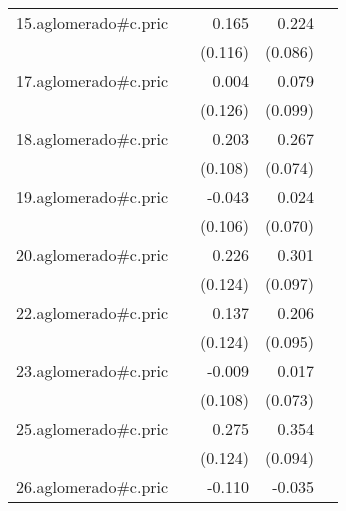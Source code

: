 {\begin{longtable}{l*{4}{D{.}{.}{-1}}}
\addlinespace
15.aglomerado#c.pric&                     &       0.165         &       0.224\sym{**} &                     \\
            &                     &     (0.116)         &     (0.086)         &                     \\
\addlinespace
17.aglomerado#c.pric&                     &       0.004         &       0.079         &                     \\
            &                     &     (0.126)         &     (0.099)         &                     \\
\addlinespace
18.aglomerado#c.pric&                     &       0.203         &       0.267\sym{***}&                     \\
            &                     &     (0.108)         &     (0.074)         &                     \\
\addlinespace
19.aglomerado#c.pric&                     &      -0.043         &       0.024         &                     \\
            &                     &     (0.106)         &     (0.070)         &                     \\
\addlinespace
20.aglomerado#c.pric&                     &       0.226         &       0.301\sym{**} &                     \\
            &                     &     (0.124)         &     (0.097)         &                     \\
\addlinespace
22.aglomerado#c.pric&                     &       0.137         &       0.206\sym{*}  &                     \\
            &                     &     (0.124)         &     (0.095)         &                     \\
\addlinespace
23.aglomerado#c.pric&                     &      -0.009         &       0.017         &                     \\
            &                     &     (0.108)         &     (0.073)         &                     \\
\addlinespace
25.aglomerado#c.pric&                     &       0.275\sym{*}  &       0.354\sym{***}&                     \\
            &                     &     (0.124)         &     (0.094)         &                     \\
\addlinespace
26.aglomerado#c.pric&                     &      -0.110         &      -0.035         &                     \\

\end{longtable}}
